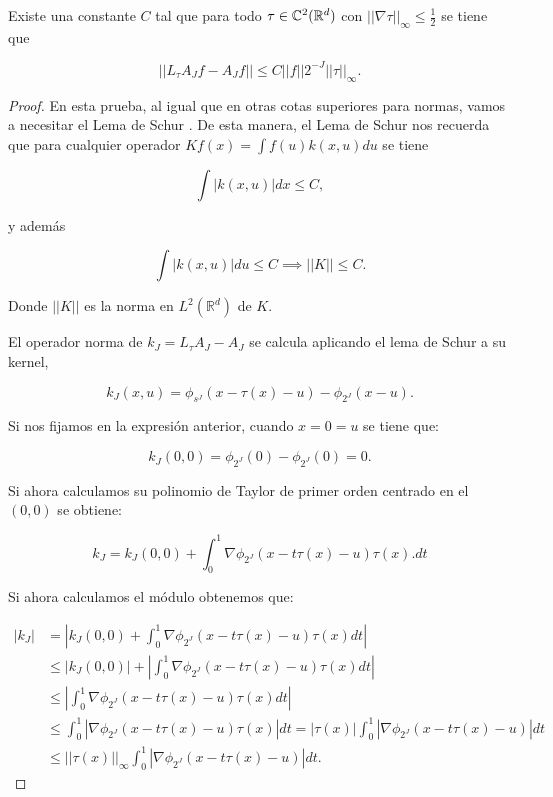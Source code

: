 \begin{lema} \label{lema::constante}
  Existe una constante $C$ tal que para todo $\tau \in \mathbb{C}^2(\mathbb{R}^d)$ con $||\nabla \tau ||_\infty \leq \frac{1}{2}$ se tiene que 
  
  $$||L_\tau A_J f - A_J f|| \leq C ||f||2^{-J}||\tau||_{\infty}.$$
\end{lema}

\begin{proof}

  \noindent En esta prueba, al igual que en otras cotas superiores para normas, vamos a necesitar el Lema de Schur \cite{SchurLemma}. De esta manera, el Lema de Schur nos recuerda que para cualquier operador $Kf(x)=\int f(u)k(x,u)du$ se tiene 

  $$\int |k(x,u)| dx \leq C,$$

  \noindent y además 

  $$\int |k(x,u)|du \leq C \implies ||K||\leq C.$$

  \noindent Donde $||K||$ es la norma en $L^2(\mathbb{R}^d)$ de $K$.

  \medskip

  El operador norma de $k_J=L_\tau A_J - A_J$ se calcula aplicando el lema de Schur a su kernel,

  $$k_J(x,u)=\phi_{s^J}(x-\tau(x)-u)-\phi_{2^J}(x-u).$$

  \noindent Si nos fijamos en la expresión anterior, cuando $x=0=u$ se tiene que: 

  $$k_J(0,0)=\phi_{2^J}(0)-\phi_{2^J}(0)=0.$$

  \noindent Si ahora calculamos su polinomio de Taylor de primer orden centrado en el $(0,0)$ se obtiene: 

  $$k_J=k_J(0,0)+\int_0^1 \nabla \phi_{2^J} (x-t\tau(x)-u)\tau(x). dt$$

  \noindent Si ahora calculamos el módulo obtenemos que:

  \begin{align*}
    |k_J|&=|k_J(0,0)+\int_0^1 \nabla \phi_{2^J} (x-t\tau(x)-u)\tau(x) dt| \\
    &\leq |k_J(0,0)|+\left|\int_0^1 \nabla \phi_{2^J} (x-t\tau(x)-u)\tau(x) dt \right| \\
    & \leq \left|\int_0^1 \nabla \phi_{2^J} (x-t\tau(x)-u)\tau(x) dt \right| \\ 
    & \leq \int_0^1 \left| \nabla \phi_{2^J} (x-t\tau(x)-u)\tau(x)  \right|dt= |\tau(x)|\int_0^1 \left| \nabla \phi_{2^J} (x-t\tau(x)-u)\right|dt  \\ 
    & \leq ||\tau(x)||_\infty \int_0^1 \left| \nabla \phi_{2^J} (x-t\tau(x)-u)\right|dt.
  \end{align*}


\end{proof}

